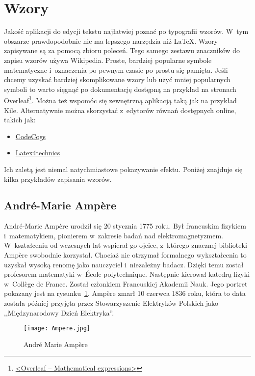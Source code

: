 \section{Wzory}
Jakość aplikacji do edycji tekstu najłatwiej poznać po typografii wzorów. W~tym obszarze prawdopodobnie nie ma lepszego narzędzia niż \LaTeX{}. Wzory zapisywane są za pomocą zbioru poleceń. Tego samego zestawu znaczników do zapisu wzorów używa Wikipedia. Proste, bardziej popularne symbole matematyczne i~oznaczenia po pewnym czasie po prostu się pamięta. Jeśli chcemy uzyskać bardziej skomplikowane wzory lub użyć mniej popularnych symboli to warto sięgnąć po dokumentację dostępną na przykład na stronach Overleaf\footnote{\href{https://www.overleaf.com/learn/latex/Mathematical_expressions}{<Overleaf -- Mathematical expressions>}}. Można też wspomóc się zewnętrzną aplikacją taką jak na przykład Kile. Alternatywnie można skorzystać z~edytorów równań dostępnych online, takich jak:
\begin{itemize}
    \item \href{https://latex.codecogs.com/eqneditor/editor.php}{CodeCogs}
    \item \href{https://www.latex4technics.com/}{Latex4technics}
\end{itemize}
Ich zaletą jest niemal natychmiastowe pokazywanie efektu. Poniżej znajduje się kilka przykładów zapisania wzorów.

\subsection{André-Marie Ampère}
André-Marie Ampère urodził się 20 stycznia 1775 roku. Był francuskim fizykiem i~matematykiem, pionierem w~zakresie badań nad elektromagnetyzmem. W~kształceniu od wczesnych lat wspierał go ojciec, z~którego znacznej biblioteki Ampère swobodnie korzystał. Chociaż nie otrzymał formalnego wykształcenia to uzyskał wysoką renomę jako nauczyciel i~niezależny badacz. Dzięki temu został profesorem matematyki w~École polytechnique. Następnie kierował katedrą fizyki w~Collège de France. Został członkiem Francuskiej Akademii Nauk. Jego portret pokazany jest na rysunku~\ref{rys:ampere}. Ampère zmarł 10 czerwca 1836 roku, która to data została później przyjęta przez Stowarzyszenie Elektryków Polskich jako ,,Międzynarodowy Dzień Elektryka''.

\begin{figure}[!hb]
	\centering \texttt{[image: Ampere.jpg]}
	\caption{André Marie Ampère}
	\label{rys:ampere}
\end{figure}

